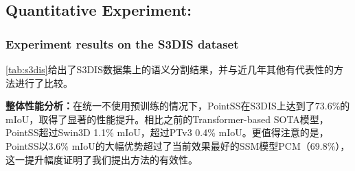 \documentclass[preprint,12pt]{elsarticle}
\begin{document}
\subsection{Quantitative Experiment:}
\subsubsection{Experiment results on the S3DIS dataset}
\cref{tab:s3dis}给出了S3DIS数据集上的语义分割结果，并与近几年其他有代表性的方法进行了比较。

\textbf{整体性能分析：}在统一不使用预训练的情况下，PointSS在S3DIS上达到了73.6\%的mIoU，取得了显著的性能提升。相比之前的Transformer-based SOTA模型，PointSS超过Swin3D 1.1\% mIoU，超过PTv3 0.4\% mIoU。更值得注意的是，PointSS以3.6\% mIoU的大幅优势超过了当前效果最好的SSM模型PCM（69.8\%），这一提升幅度证明了我们提出方法的有效性。
\end{document}
